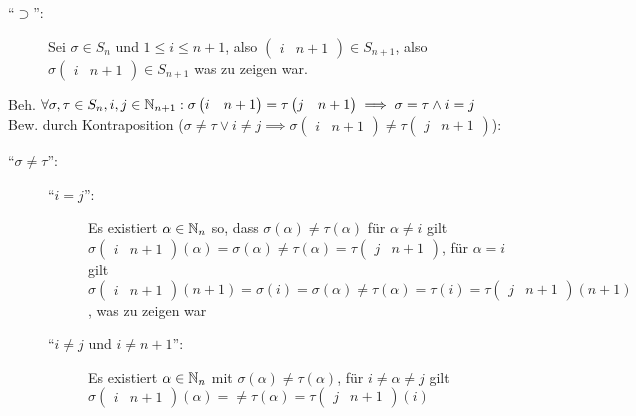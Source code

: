\documentclass[sectionformat = aufgabe]{gadsescript}
\begin{document}
\begin{enumerate}[label=(\alph*)]
\begin{description}
\begin{description}
					\item[``$ \supset  $'':] Sei $ \sigma \in S_n $ und $ 1 \leq i \leq n + 1 $, also $ \begin{pmatrix} i & n + 1 \end{pmatrix} \in S_{n + 1}  $, also $ \sigma \begin{pmatrix} i & n + 1 \end{pmatrix} \in S_{n + 1}  $ was zu zeigen war.
				\end{description}
				Beh. $ \forall \sigma, \tau \in S_{n} , i, j \in \mathbb{N} _{n + 1} : \sigma \begin{pmatrix} i & n + 1 \end{pmatrix} = \tau \begin{pmatrix} j & n + 1 \end{pmatrix} \implies \sigma = \tau \wedge i = j $\\
				Bew. durch Kontraposition ($ \sigma \neq \tau \vee i \neq j \implies \sigma \begin{pmatrix} i & n + 1 \end{pmatrix} \neq \tau \begin{pmatrix} j & n + 1 \end{pmatrix}  $):
				\begin{description}
					\item[``$ \sigma \neq \tau $'':] 
						\begin{description}
							\item[``$ i = j $'':] Es existiert $ \alpha \in \mathbb{N} _n$ so, dass $ \sigma(\alpha) \neq \tau (\alpha) $ für $ \alpha \neq i $ gilt $ \sigma \begin{pmatrix} i & n + 1 \end{pmatrix} (\alpha) = \sigma(\alpha) \neq \tau (\alpha)  = \tau \begin{pmatrix} j & n + 1 \end{pmatrix} $, für $ \alpha = i $ gilt
								$ \sigma \begin{pmatrix} i & n + 1 \end{pmatrix} (n + 1) = \sigma(i) = \sigma(\alpha) \neq \tau (\alpha)  =\tau (i) = \tau \begin{pmatrix} j & n + 1 \end{pmatrix} (n + 1) $, was zu zeigen war
							\item[``$ i \neq j $ und $ i \neq n + 1 $'':] Es existiert $ \alpha \in \mathbb{N} _n $ mit $ \sigma(\alpha) \neq \tau(\alpha) $,
								für $ i \neq \alpha \neq j $ gilt
								$ \sigma \begin{pmatrix} i & n + 1 \end{pmatrix} ( \alpha ) = \neq \tau (\alpha) = \tau \begin{pmatrix} j & n + 1 \end{pmatrix} (i) $

\end{description}
\end{description}
\end{description}
\end{enumerate}
\end{document}
